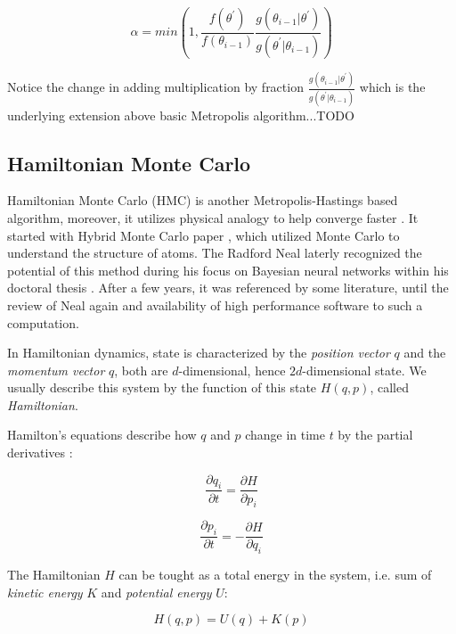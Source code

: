 \documentclass[
  digital, %
  oneside, %
  lof,     %
  lot,     %
]{fithesis4}
\begin{document}
\begin{equation}
  \alpha = min\left(1, \frac{f(\theta^{\prime})}{f(\theta_{i-1})} \frac{g(\theta_{i-1} | \theta^{\prime})}{g(\theta^{\prime} | \theta_{i-1})}\right)  
\end{equation}

Notice the change in adding multiplication by fraction 
$\frac{g(\theta_{i-1} | \theta^{\prime})}{g(\theta^{\prime} | \theta_{i-1})}$ 
which is the underlying extension above basic Metropolis 
algorithm...TODO


\subsection{Hamiltonian Monte Carlo}

Hamiltonian Monte Carlo (HMC) is another Metropolis-Hastings 
based algorithm, moreover, it utilizes physical analogy to 
help converge faster \cite{betancourt2018}. 
It started with Hybrid Monte Carlo paper \cite{duane1987}, 
which utilized Monte Carlo to understand the structure 
of atoms. 
The Radford Neal laterly recognized the potential of 
this method during his focus on Bayesian neural networks 
within his doctoral thesis \cite{neal1995}. 
After a few years, it was referenced by some literature, 
until the review of Neal again \cite{neal2011} and availability 
of high performance software to such a computation.

In Hamiltonian dynamics, state is characterized by the
\textit{position vector} $q$ and the \textit{momentum vector} $q$,
both are $d$-dimensional, hence $2d$-dimensional state.
We usually describe this system by the function of
this state $H(q, p)$, called \textit{Hamiltonian}.

Hamilton’s equations describe how $q$ and
$p$ change in time $t$ by the partial derivatives \cite{neal2011}:

\begin{equation}
  \frac{\partial q_i}{\partial t} = \frac{\partial H}{\partial p_i}
\end{equation}

\begin{equation}
  \frac{\partial p_i}{\partial t} = - \frac{\partial H}{\partial q_i}
\end{equation}

The Hamiltonian $H$ can be tought as a total energy in the system,
i.e. sum of \textit{kinetic energy} $K$ and \textit{potential energy} $U$:

\begin{equation}
  H(q, p) = U(q) + K(p)
\end{equation}
\end{document}
